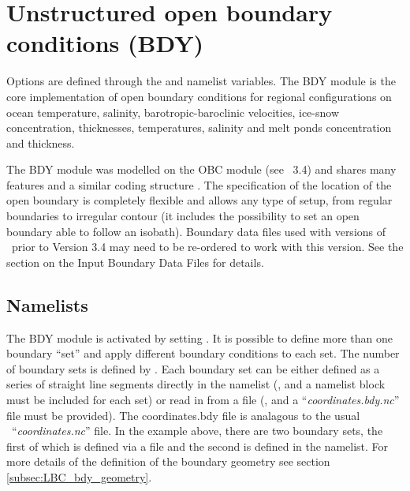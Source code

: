 \documentclass[../main/NEMO_manual]{subfiles}
\begin{document}
\section{Unstructured open boundary conditions (BDY)}
\label{sec:LBC_bdy}

\begin{listing}
  \caption{}
  \label{lst:nambdy}
\end{listing}

\begin{listing}
  \caption{}
  \label{lst:nambdy_dta}
\end{listing}

Options are defined through the  and  namelist variables.
The BDY module is the core implementation of open boundary conditions for regional configurations on
ocean temperature, salinity, barotropic-baroclinic velocities, ice-snow concentration, thicknesses, temperatures, salinity and melt ponds concentration and thickness.

The BDY module was modelled on the OBC module (see \NEMO\ 3.4) and shares many features and
a similar coding structure \citep{chanut_trpt05}.
The specification of the location of the open boundary is completely flexible and
allows any type of setup, from regular boundaries to irregular contour (it includes the possibility to set an open boundary able to follow an isobath).
Boundary data files used with versions of \NEMO\ prior to Version 3.4 may need to be re-ordered to work with this version.
See the section on the Input Boundary Data Files for details.

\subsection{Namelists}
\label{subsec:LBC_bdy_namelist}

The BDY module is activated by setting  .
It is possible to define more than one boundary ``set'' and apply different boundary conditions to each set.
The number of boundary sets is defined by .
Each boundary set can be either defined as a series of straight line segments directly in the namelist
(, and a namelist block  must be included for each set) or read in from a file (, and a ``\textit{coordinates.bdy.nc}'' file must be provided).
The coordinates.bdy file is analagous to the usual \NEMO\ ``\textit{coordinates.nc}'' file.
In the example above, there are two boundary sets, the first of which is defined via a file and
the second is defined in the namelist.
For more details of the definition of the boundary geometry see section \autoref{subsec:LBC_bdy_geometry}.
\end{document}
